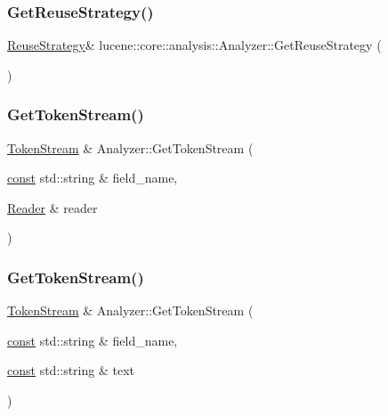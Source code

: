 \subsubsection{\texorpdfstring{Get\+Reuse\+Strategy()}{GetReuseStrategy()}}
{\footnotesize\ttfamily \mbox{\hyperlink{classlucene_1_1core_1_1analysis_1_1Analyzer_1_1ReuseStrategy}{Reuse\+Strategy}}\& lucene\+::core\+::analysis\+::\+Analyzer\+::\+Get\+Reuse\+Strategy (\begin{DoxyParamCaption}{ }\end{DoxyParamCaption})}

\mbox{\label{classlucene_1_1core_1_1analysis_1_1Analyzer_a010cdb318b51c27c46b8cbf5a1cfe20e}} 
\subsubsection{\texorpdfstring{Get\+Token\+Stream()}{GetTokenStream()}\hspace{0.1cm}{\footnotesize\ttfamily [1/2]}}
{\footnotesize\ttfamily \mbox{\hyperlink{classlucene_1_1core_1_1analysis_1_1TokenStream}{Token\+Stream}} \& Analyzer\+::\+Get\+Token\+Stream (\begin{DoxyParamCaption}\item[{\mbox{\hyperlink{ZlibCrc32_8h_a2c212835823e3c54a8ab6d95c652660e}{const}} std\+::string \&}]{field\+\_\+name,  }\item[{\mbox{\hyperlink{classlucene_1_1core_1_1analysis_1_1Reader}{Reader}} \&}]{reader }\end{DoxyParamCaption})}

\mbox{\label{classlucene_1_1core_1_1analysis_1_1Analyzer_a385dbda39ff79997402b35ddbb296697}} 
\subsubsection{\texorpdfstring{Get\+Token\+Stream()}{GetTokenStream()}\hspace{0.1cm}{\footnotesize\ttfamily [2/2]}}
{\footnotesize\ttfamily \mbox{\hyperlink{classlucene_1_1core_1_1analysis_1_1TokenStream}{Token\+Stream}} \& Analyzer\+::\+Get\+Token\+Stream (\begin{DoxyParamCaption}\item[{\mbox{\hyperlink{ZlibCrc32_8h_a2c212835823e3c54a8ab6d95c652660e}{const}} std\+::string \&}]{field\+\_\+name,  }\item[{\mbox{\hyperlink{ZlibCrc32_8h_a2c212835823e3c54a8ab6d95c652660e}{const}} std\+::string \&}]{text }\end{DoxyParamCaption})}

